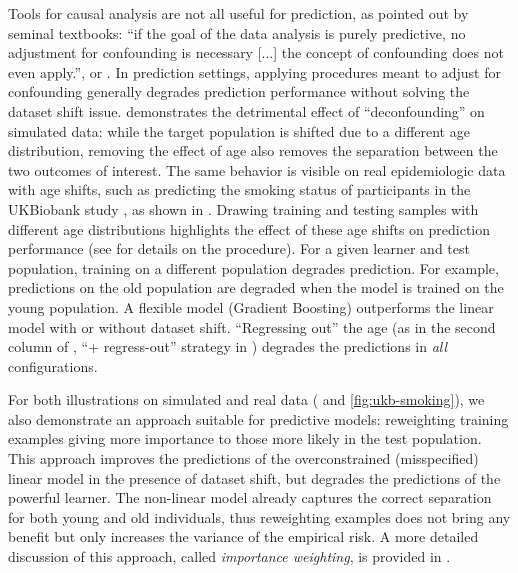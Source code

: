 \documentclass[a4paper,num-refs]{oup-contemporary}
\begin{document}
Tools for causal analysis are not all useful for prediction, 
as pointed out by seminal textbooks:
``if the
goal of the data analysis is purely predictive, no adjustment for confounding is
necessary [...] the concept of confounding does not even apply.''\citep[Sec.
18.1]{hernan2020causal}, or \citet{pearl2019seven}.
%
In prediction settings, applying procedures meant to adjust for confounding 
generally degrades prediction performance without solving the dataset
shift issue.
 demonstrates the detrimental effect of ``deconfounding''
on simulated data: while the target population is shifted due to a
different age distribution, removing the effect of age also removes
the separation between the two outcomes of interest.
%
The same behavior is visible on real epidemiologic data with age shifts,
such as predicting the
smoking status of participants in the UKBiobank study
\citep{sudlow2015uk}, as shown in .
Drawing training and testing samples with different age distributions
highlights the effect of these age shifts on prediction performance
(see  for details on the procedure). 
For a given learner and test population, training on a different population degrades prediction.
For example, predictions on the old population are degraded when the model is trained on the young population.
A flexible model (Gradient Boosting) outperforms the linear model with or without dataset shift.
``Regressing out'' the age (as in the second column of , ``+ regress-out'' strategy in ) degrades the predictions in \emph{all} configurations.

For both illustrations on simulated and real data (
and \ref{fig:ukb-smoking}), we also demonstrate an approach suitable for
predictive models: reweighting training examples giving more importance to those more likely in the test population.
This approach improves the predictions of the overconstrained (misspecified) linear model in the presence of dataset shift, but degrades the predictions of the powerful learner.
The non-linear model already captures the correct separation for both young and old individuals, thus reweighting examples does not bring any benefit but only increases the variance of the empirical risk.
A more detailed discussion of this approach, called \emph{importance weighting}, is provided in .
\end{document}
